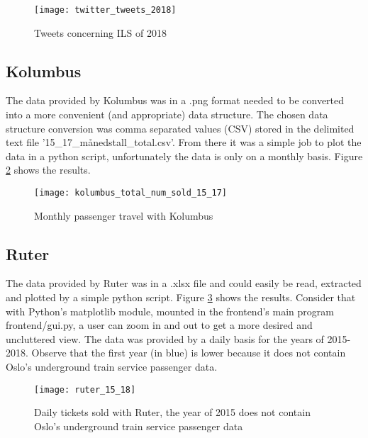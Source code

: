 \begin{figure}[ht]
\texttt{[image: twitter\_tweets\_2018]}
\centering
\caption{Tweets concerning ILS of 2018}
\label{fig:twitterAnal}
\end{figure}

\newpage







\subsection{Kolumbus}
The data provided by Kolumbus was in a .png format needed to be converted into a more convenient (and appropriate) data structure. The chosen data structure conversion was comma separated values (CSV) stored in the delimited text file '15\_17\_månedstall\_total.csv'. From there it was a simple job to plot the data in a python script, unfortunately the data is only on a monthly basis. Figure \ref{fig:kolumbus_15_17} shows the results.

\begin{figure}[!htb]
\texttt{[image: kolumbus\_total\_num\_sold\_15\_17]}
\centering
\caption{Monthly passenger travel with Kolumbus}
\label{fig:kolumbus_15_17}
\end{figure}







\subsection{Ruter}
The data provided by Ruter was in a .xlsx file and could easily be read, extracted and plotted by a simple python script. Figure \ref{fig:ruter_15_18} shows the results. Consider that with Python's matplotlib module, mounted in the frontend's main program frontend/gui.py, a user can zoom in and out to get a more desired and uncluttered view. The data was provided by a daily basis for the years of 2015-2018. Observe that the first year (in blue) is lower because it does not contain Oslo's underground train service passenger data.

\begin{figure}[!htb]
\texttt{[image: ruter\_15\_18]}
\centering
\caption{Daily tickets sold with Ruter, the year of 2015 does not contain Oslo's underground train service passenger data}
\label{fig:ruter_15_18}
\end{figure}

